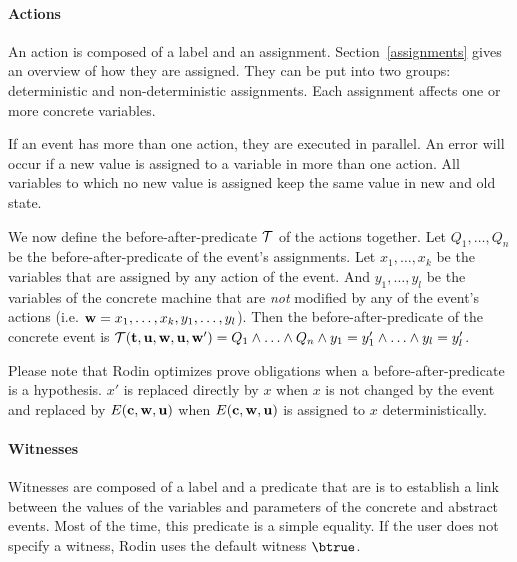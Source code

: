 \paragraph{Actions}
\label{actions}
An action is composed of a label and an assignment.
Section~\ref{assignments} gives an overview of how they are assigned.
They can be put into two groups: deterministic and non-deterministic assignments.
Each assignment affects one or more concrete variables.

If an event has more than one action, they are executed in parallel. 
An error will occur if a new value is assigned to a variable in more than one action.
All variables to which no new value is assigned keep the same value in new and old state.

We now define the before-after-predicate $\mathcal{T}$ of the actions together.
Let $Q_1,\ldots,Q_n$ be the before-after-predicate of the event's assignments. 
Let $x_1,\ldots,x_k$ be the variables that are assigned by any action of the event.
And $y_1,\ldots,y_l$ be the variables of the concrete machine that are \emph{not} modified by any of 
 the event's actions (i.e. $\mathbf{w} = x_1,\ldots,x_k,y_1,\ldots,y_l$).
Then the before-after-predicate of the concrete event is 
  $\mathcal{T}({\mathbf{t},\mathbf{u}},\mathbf{w},\mathbf{u},\mathbf{w}') = Q_1 \land \ldots \land Q_n \land y_1 = y_1' \land \ldots \land y_l=y_l'$.

Please note that Rodin optimizes prove obligations when a before-after-predicate is a hypothesis.
$x'$ is replaced directly by $x$ when $x$ is not changed by the event and replaced by $E(\mathbf{c},\mathbf{w},\mathbf{u})$
 when $E(\mathbf{c},\mathbf{w},\mathbf{u})$ is assigned to $x$ deterministically.

\paragraph{Witnesses}
\label{witness}

Witnesses are composed of a label and a predicate that are is to establish a link between the values 
  of the variables and parameters of the concrete and abstract events.
Most of the time, this predicate is a simple equality.
If the user does not specify a witness, Rodin uses the default witness $\btrue$.

